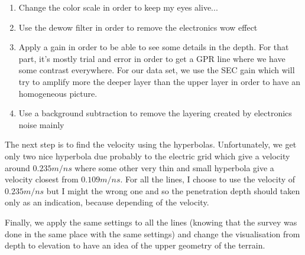 \begin{enumerate}
    \item Change the color scale in order to keep my eyes alive...
    \item Use the dewow filter in order to remove the electronics wow effect
    \item Apply a gain in order to be able to see some details in the depth. For that part, it's mostly trial and error in order to get a GPR line where we have some contrast everywhere. For our data set, we use the SEC gain which will try to amplify more the deeper layer than the upper layer in order to have an homogeneous picture.
    \item Use a background subtraction to remove the layering created by electronics noise mainly
\end{enumerate}

The next step is to find the velocity using the hyperbolas. Unfortunately, we get only two nice hyperbola due probably to the electric grid which give a velocity around $0.235 m/ns$ where some other very thin and small hyperbola give a velocity closest from $0.109 m/ns$. For all the lines, I choose to use the velocity of $0.235 m/ns$ but I might the wrong one and so the penetration depth should taken only as an indication, because depending of the velocity.

Finally, we apply the same settings to all the lines (knowing that the survey was done in the same place with the same settings) and change the visualisation from depth to elevation to have an idea of the upper geometry of the terrain.
